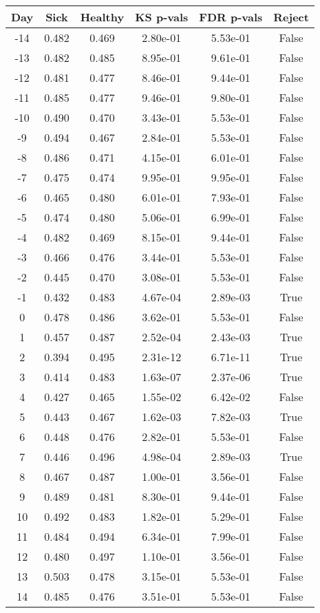 \begin{tabular}{c|c|c|c|c|c}
Day &  Sick & Healthy &  KS p-vals & FDR p-vals & Reject\\
\hline
-14 & 0.482 &   0.469 &   2.80e-01 &   5.53e-01 &  False\\
-13 & 0.482 &   0.485 &   8.95e-01 &   9.61e-01 &  False\\
-12 & 0.481 &   0.477 &   8.46e-01 &   9.44e-01 &  False\\
-11 & 0.485 &   0.477 &   9.46e-01 &   9.80e-01 &  False\\
-10 & 0.490 &   0.470 &   3.43e-01 &   5.53e-01 &  False\\
 -9 & 0.494 &   0.467 &   2.84e-01 &   5.53e-01 &  False\\
 -8 & 0.486 &   0.471 &   4.15e-01 &   6.01e-01 &  False\\
 -7 & 0.475 &   0.474 &   9.95e-01 &   9.95e-01 &  False\\
 -6 & 0.465 &   0.480 &   6.01e-01 &   7.93e-01 &  False\\
 -5 & 0.474 &   0.480 &   5.06e-01 &   6.99e-01 &  False\\
 -4 & 0.482 &   0.469 &   8.15e-01 &   9.44e-01 &  False\\
 -3 & 0.466 &   0.476 &   3.44e-01 &   5.53e-01 &  False\\
 -2 & 0.445 &   0.470 &   3.08e-01 &   5.53e-01 &  False\\
 -1 & 0.432 &   0.483 &   4.67e-04 &   2.89e-03 &   True\\
  0 & 0.478 &   0.486 &   3.62e-01 &   5.53e-01 &  False\\
  1 & 0.457 &   0.487 &   2.52e-04 &   2.43e-03 &   True\\
  2 & 0.394 &   0.495 &   2.31e-12 &   6.71e-11 &   True\\
  3 & 0.414 &   0.483 &   1.63e-07 &   2.37e-06 &   True\\
  4 & 0.427 &   0.465 &   1.55e-02 &   6.42e-02 &  False\\
  5 & 0.443 &   0.467 &   1.62e-03 &   7.82e-03 &   True\\
  6 & 0.448 &   0.476 &   2.82e-01 &   5.53e-01 &  False\\
  7 & 0.446 &   0.496 &   4.98e-04 &   2.89e-03 &   True\\
  8 & 0.467 &   0.487 &   1.00e-01 &   3.56e-01 &  False\\
  9 & 0.489 &   0.481 &   8.30e-01 &   9.44e-01 &  False\\
 10 & 0.492 &   0.483 &   1.82e-01 &   5.29e-01 &  False\\
 11 & 0.484 &   0.494 &   6.34e-01 &   7.99e-01 &  False\\
 12 & 0.480 &   0.497 &   1.10e-01 &   3.56e-01 &  False\\
 13 & 0.503 &   0.478 &   3.15e-01 &   5.53e-01 &  False\\
 14 & 0.485 &   0.476 &   3.51e-01 &   5.53e-01 &  False\\
\end{tabular}